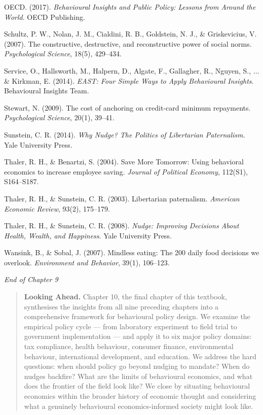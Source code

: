 \documentclass[12pt, letterpaper]{article}
\begin{document}
OECD. (2017). \textit{Behavioural Insights and Public Policy: Lessons from Around the World}. OECD Publishing.

Schultz, P. W., Nolan, J. M., Cialdini, R. B., Goldstein, N. J., \& Griskevicius, V. (2007). The constructive, destructive, and reconstructive power of social norms. \textit{Psychological Science}, 18(5), 429--434.

Service, O., Hallsworth, M., Halpern, D., Algate, F., Gallagher, R., Nguyen, S., ... \& Kirkman, E. (2014). \textit{EAST: Four Simple Ways to Apply Behavioural Insights}. Behavioural Insights Team.

Stewart, N. (2009). The cost of anchoring on credit-card minimum repayments. \textit{Psychological Science}, 20(1), 39--41.

Sunstein, C. R. (2014). \textit{Why Nudge? The Politics of Libertarian Paternalism}. Yale University Press.

Thaler, R. H., \& Benartzi, S. (2004). Save More Tomorrow: Using behavioral economics to increase employee saving. \textit{Journal of Political Economy}, 112(S1), S164--S187.

Thaler, R. H., \& Sunstein, C. R. (2003). Libertarian paternalism. \textit{American Economic Review}, 93(2), 175--179.

Thaler, R. H., \& Sunstein, C. R. (2008). \textit{Nudge: Improving Decisions About Health, Wealth, and Happiness}. Yale University Press.

Wansink, B., \& Sobal, J. (2007). Mindless eating: The 200 daily food decisions we overlook. \textit{Environment and Behavior}, 39(1), 106--123.

\medskip

\textit{End of Chapter 9}

\medskip

\begin{quote}
\textbf{Looking Ahead.} Chapter 10, the final chapter of this textbook, synthesises the insights from all nine preceding chapters into a comprehensive framework for behavioural policy design. We examine the empirical policy cycle --- from laboratory experiment to field trial to government implementation --- and apply it to six major policy domains: tax compliance, health behaviour, consumer finance, environmental behaviour, international development, and education. We address the hard questions: when should policy go beyond nudging to mandate? When do nudges backfire? What are the limits of behavioural economics, and what does the frontier of the field look like? We close by situating behavioural economics within the broader history of economic thought and considering what a genuinely behavioural economics-informed society might look like.
\end{quote}
\end{document}
